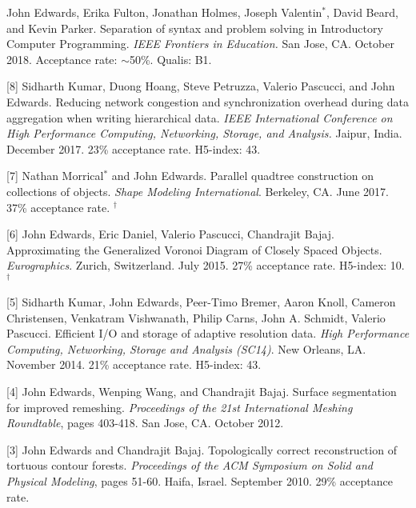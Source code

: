 \documentclass[margin,line]{res}
\newcommand{\pubunder}[1]{#1}
\newcommand{\cnum}[1]{[#1]}
\begin{document}
\begin{resume}
\cnum{9} John Edwards, Erika Fulton, Jonathan Holmes, Joseph Valentin$^*$, David Beard, and Kevin Parker. Separation of syntax and problem solving in Introductory Computer Programming. \textit{IEEE Frontiers in Education.} San Jose, CA. October 2018.  Acceptance rate: $\sim$50\%. Qualis: B1.

\cnum{8} Sidharth Kumar, Duong Hoang, Steve Petruzza, Valerio Pascucci, and \pubunder{John Edwards}. Reducing network congestion and synchronization overhead during data aggregation when writing hierarchical data. \textit{IEEE International Conference on High Performance Computing, Networking, Storage, and Analysis.} Jaipur, India. December 2017. 23\% acceptance rate. H5-index: 43.

\cnum{7} Nathan Morrical$^*$ and \pubunder{John Edwards}. Parallel quadtree construction on collections of objects. \textit{Shape Modeling International}. Berkeley, CA. June 2017. 37\% acceptance rate.
$^\dagger$

\cnum{6} \pubunder{John Edwards}, Eric Daniel, Valerio Pascucci, Chandrajit Bajaj. Approximating the Generalized Voronoi Diagram of Closely Spaced Objects. \textit{Eurographics}. Zurich, Switzerland. July 2015. 27\% acceptance rate. H5-index: 10.
$^\dagger$

\cnum{5} Sidharth Kumar, \pubunder{John Edwards}, Peer-Timo Bremer, Aaron Knoll, Cameron Christensen, Venkatram Vishwanath, Philip Carns, John A. Schmidt, Valerio Pascucci. Efficient I/O and storage of adaptive resolution data. \textit{High Performance Computing, Networking, Storage and Analysis (SC14)}. New Orleans, LA. November 2014. 21\% acceptance rate. H5-index: 43.

\cnum{4} \pubunder{John Edwards}, Wenping Wang, and Chandrajit Bajaj. Surface segmentation for improved remeshing. \textit{Proceedings of the 21st International Meshing Roundtable}, pages 403-418. San Jose, CA. October 2012.

\cnum{3} \pubunder{John Edwards} and Chandrajit Bajaj. Topologically correct reconstruction of tortuous contour forests. \textit{Proceedings of the ACM Symposium on Solid and Physical Modeling}, pages 51-60. Haifa, Israel. September 2010. 29\% acceptance rate.


\end{resume}
\end{document}
